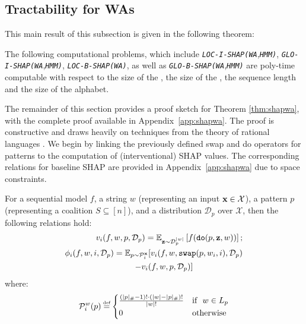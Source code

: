 \subsection{Tractability for WAs} \label{subsec:shapwa}
This main result of this subsection is given in the following theorem:
\begin{theorem} \label{thm:shapwa}
    The following computational problems, which include \emph{\texttt{LOC-I-SHAP}}\emph{\texttt{(WA}},\emph{\texttt{HMM)}}, \emph{\texttt{GLO-I-SHAP}}\emph{\texttt{(WA}},\emph{\texttt{HMM)}}, \emph{\texttt{LOC-B-SHAP}}\emph{\texttt{(WA)}}, as well as \emph{\texttt{GLO-B-SHAP}}\emph{\texttt{(WA}},\emph{\texttt{HMM)}} are poly-time computable with respect to the size of the , the size of the , the sequence length and the size of the alphabet.
\end{theorem}

The remainder of this section provides a proof sketch for Theorem \ref{thm:shapwa}, with the complete proof available in Appendix~\ref{app:shapwa}. The proof is constructive and draws heavily on techniques from the theory of rational languages \citep{berstel88}. We begin by linking the previously defined swap and do operators for patterns to the computation of (interventional) SHAP values. The corresponding relations for baseline SHAP are provided in Appendix~\ref{app:shapwa} due to space constraints.

\begin{lemma}
For a sequential model $f$, a string $w$ (representing an input $\textbf{x}\in\mathcal{X}$), a pattern $p$ (representing a coalition $S\subseteq [n]$), and a distribution $\mathcal{D}_p$ over $\mathcal{X}$, then the following relations hold:
\begin{equation}
\begin{aligned}
        v_{i}(f,w,p,\mathcal{D}_p) = \mathbb{E}_{\textbf{z} \sim \mathcal{D}_p^{|w|}} \left[ f(\texttt{do}(p,\textbf{z},w)) \right]; \\
        \phi_i(f,w,i,\mathcal{D}_p) = \mathbb{E}_{p \sim \mathcal{P}_i^{\textbf{x}}} [v_{i}(f,w,\texttt{swap}(p,w_{i},i),\mathcal{D}_p) \nonumber 
 \\ - v_{i}(f,w,p,\mathcal{D}_p)] \quad\quad\quad\quad\quad\quad
\end{aligned}
\end{equation}
where:
\begin{equation*}
\begin{aligned}
\mathcal{P}_{i}^{w}(p)  \myeq \begin{cases}
\frac{(|p|_{\#}-1)! \cdot (|w| - |p|_{\#})!}{|w|!} & \text{if}~~ w \in L_{p} \\ 
0 & \text{otherwise}
\end{cases}
\end{aligned}
\end{equation*}
\end{lemma}

